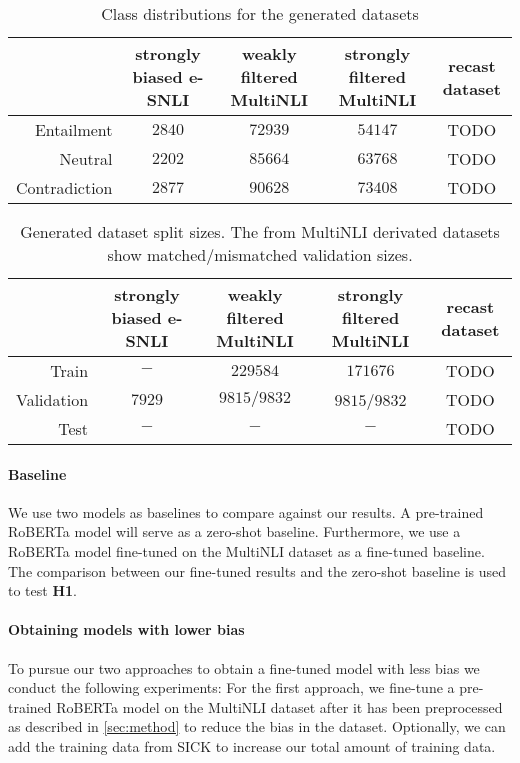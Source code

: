 \begin{table*}[ht]
    \centering
    \caption{Class distributions for the generated datasets}
    \begin{tabular}{r || c | c | c | c}
        & strongly biased \acs{e-SNLI} & weakly filtered \acs{MultiNLI} & strongly filtered \acs{MultiNLI} & recast dataset \\
        \hline
      Entailment & $2840$ & $72939$ & $54147$ & TODO\\
      Neutral & $2202$ & $85664$ & $63768$ & TODO\\
      Contradiction & $2877$ & $90628$ & $73408$ & TODO
    \end{tabular}
    \label{tab:internal_datasets:classes}
\end{table*}

\begin{table*}[h]
    \centering
    \caption{Generated dataset split sizes. The from \acs{MultiNLI} derivated datasets show matched/mismatched validation sizes.}
    \begin{tabular}{r || c | c | c | c}
        & strongly biased \acs{e-SNLI} & weakly filtered \acs{MultiNLI} & strongly filtered \acs{MultiNLI} & recast dataset \\
        \hline
      Train & $ - $ & $229584$ & $171676$ & TODO \\
      Validation & $7929$ & $9815/9832$ & $9815$/$9832$ & TODO \\
      Test & $ - $ & $ - $ & $ - $ & TODO
    \end{tabular}
    \label{tab:internal_datasets:sizes}
\end{table*}
\paragraph{Baseline}
We use two models as baselines to compare against our results. A pre-trained \ac{RoBERTa} model will serve as a zero-shot baseline. Furthermore, we use a \ac{RoBERTa} model fine-tuned on the \ac{MultiNLI} dataset as a fine-tuned baseline. The comparison between our fine-tuned results and the zero-shot baseline is used to test \textbf{H1}.

\paragraph{Obtaining models with lower bias}
To pursue our two approaches to obtain a fine-tuned model with less bias we conduct the following experiments: For the first approach, we fine-tune a pre-trained \ac{RoBERTa} model on the \ac{MultiNLI} dataset after it has been preprocessed as described in \autoref{sec:method} to reduce the bias in the dataset. Optionally, we can add the training data from \ac{SICK} to increase our total amount of training data.

